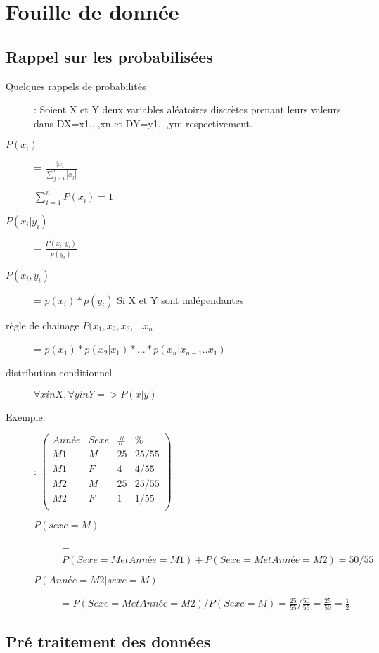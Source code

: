 \part{Fouille de donnée}
\pagebreak

\chapter{Rappel sur les probabilisées}

\begin{description}
\item[Quelques rappels de probabilités]: Soient X et Y deux variables aléatoires discrètes prenant leurs valeurs dans DX={x1,..,xn} et DY={y1,..,ym} respectivement.  
\item[$P(x_i)$] = $\frac{|x_i|}{\sum_{j=1}^n |x_j|}$
\item[] $\sum_{i=1}^n P(x_i) = 1$
\item[$P(x_i | y_i)$] = $\frac{P(x_i,y_i)}{p(y_i)}$
\item[$P(x_i,y_i)$] = $p(x_i) * p(y_i)$ Si X et Y sont indépendantes
\item[règle de chainage $P(x_1,x_2,x_3,...x_n$] = $p(x_1)*p(x_2|x_1)*...*p(x_n|x_{n-1}..x_1)$
\item[distribution conditionnel] $ \forall x in X, \forall y in Y => P(x|y)$
\end{description}

Exemple:
\begin{description}
\item[]: $\begin{pmatrix}
  Année & Sexe & \# & \%  \\
   M1 & M  & 25  &  25/55   \\
   M1 & F  & 4 &  4/55  \\
   M2 & M  & 25  & 25/55   \\
   M2 & F  & 1  &  1/55  \\
\end{pmatrix}$
\item[]
\begin{description}
\item[$P(sexe=M)$] = $P(Sexe=M et Année=M1) + P(Sexe=M et Année=M2) = 50/55$
\item[$P(Année=M2 | sexe=M)$] = $P(Sexe=M et Année=M2) / P(Sexe=M) = \frac{25}{55} / \frac{50}{55} = \frac{25}{50} = \frac{1}{2}$
\end{description}
\end{description}

\chapter{Pré traitement des données}
